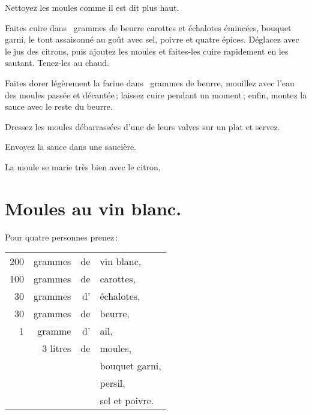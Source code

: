 Nettoyez les moules comme il est dit plus haut.

Faites cuire dans {\mmm} grammes de beurre carottes et échalotes émincées, bouquet
garni, le tout assaisonné au goût avec sel, poivre et quatre épices. Déglacez
avec le jus des citrons, puis ajoutez les moules et faites-les cuire rapidement
en les sautant. Tenez-les au chaud.

Faites dorer légèrement la farine dans {\mmm} grammes de beurre, mouillez avec
l'eau des moules passée et décantée ; laissez cuire pendant un moment ; enfin,
montez la sauce avec le reste du beurre.

Dressez les moules débarrassées d’une de leurs valves sur un plat et servez.

Envoyez la sauce dans une saucière.

La moule se marie très bien avec le citron,

\section*{\centering Moules au vin blanc.}

Pour quatre personnes prenez :

\medskip

\footnotesize
\begin{longtable}{rrrp{16em}}
    200 & grammes & de & vin blanc,                                                                       \\
    100 & grammes & de & carottes,                                                                        \\
     30 & grammes & d' & échalotes,                                                                       \\
     30 & grammes & de & beurre,                                                                          \\
      1 & gramme  & d' & ail,                                                                             \\
        & 3 litres& de & moules,                                                                          \\
        &         &    & bouquet garni,                                                                   \\
        &         &    & persil,                                                                          \\
        &         &    & sel et poivre.                                                                   \\
\end{longtable}
\normalsize

